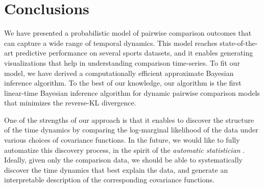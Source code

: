 \section{Conclusions}
\label{kks:sec:conclusions}

We have presented a probabilistic model of pairwise comparison outcomes that can capture a wide range of temporal dynamics.
This model reaches state-of-the-art predictive performance on several sports datasets, and it enables generating visualizations that help in understanding comparison time-series.
To fit our model, we have derived a computationally efficient approximate Bayesian inference algorithm.
To the best of our knowledge, our algorithm is the first linear-time Bayesian inference algorithm for dynamic pairwise comparison models that minimizes the reverse-KL divergence.

One of the strengths of our approach is that it enables to discover the structure of the time dynamics by comparing the log-marginal likelihood of the data under various choices of covariance functions.
In the future, we would like to fully automatize this discovery process, in the spirit of the \emph{automatic statistician} \citep{duvenaud2014automatic}.
Ideally, given only the comparison data, we should be able to systematically discover the time dynamics that best explain the data, and generate an interpretable description of the corresponding covariance functions.
